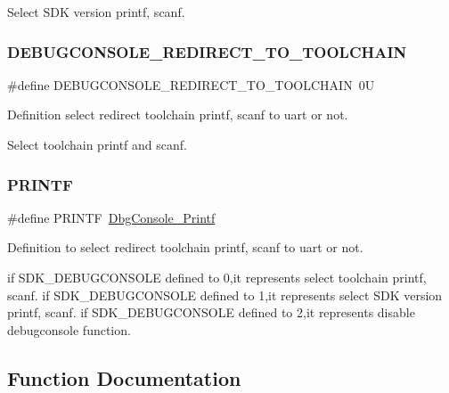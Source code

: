 Select S\+DK version printf, scanf. \mbox{\label{group__debugconsole_gabb8f0adbec02f143b4f84d2eb42126df}} 
\subsubsection{\texorpdfstring{DEBUGCONSOLE\_REDIRECT\_TO\_TOOLCHAIN}{DEBUGCONSOLE\_REDIRECT\_TO\_TOOLCHAIN}}
{\footnotesize\ttfamily \#define D\+E\+B\+U\+G\+C\+O\+N\+S\+O\+L\+E\+\_\+\+R\+E\+D\+I\+R\+E\+C\+T\+\_\+\+T\+O\+\_\+\+T\+O\+O\+L\+C\+H\+A\+IN~0U}



Definition select redirect toolchain printf, scanf to uart or not. 

Select toolchain printf and scanf. \mbox{\label{group__debugconsole_gae1649fc947ca37a86917a08354f48d1a}} 
\subsubsection{\texorpdfstring{PRINTF}{PRINTF}}
{\footnotesize\ttfamily \#define P\+R\+I\+N\+TF~\mbox{\hyperlink{group__debugconsole_ga1019139ac1c69fd62687250130c6ca7f}{Dbg\+Console\+\_\+\+Printf}}}



Definition to select redirect toolchain printf, scanf to uart or not. 

if S\+D\+K\+\_\+\+D\+E\+B\+U\+G\+C\+O\+N\+S\+O\+LE defined to 0,it represents select toolchain printf, scanf. if S\+D\+K\+\_\+\+D\+E\+B\+U\+G\+C\+O\+N\+S\+O\+LE defined to 1,it represents select S\+DK version printf, scanf. if S\+D\+K\+\_\+\+D\+E\+B\+U\+G\+C\+O\+N\+S\+O\+LE defined to 2,it represents disable debugconsole function. 

\subsection{Function Documentation}
\mbox{\label{group__debugconsole_gad80e7aa70bbb3fce1a9168621372833e}} 

